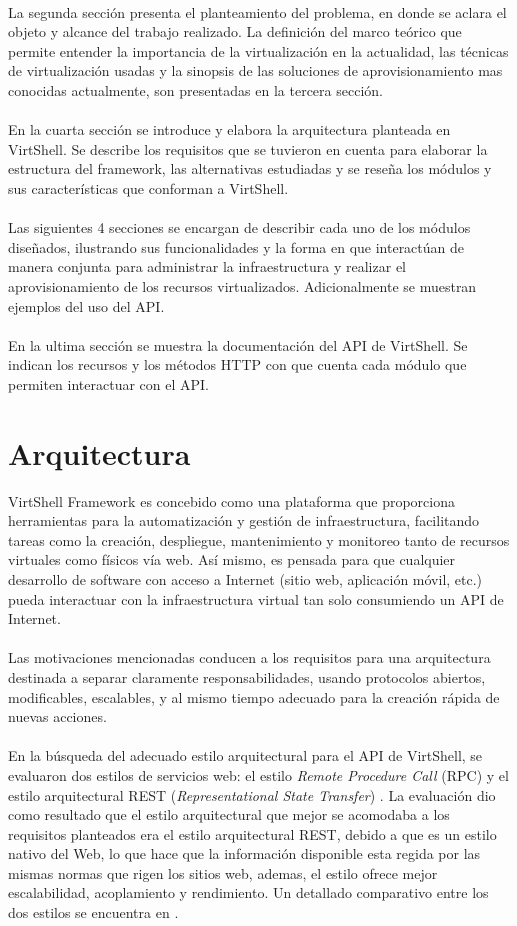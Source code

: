 \documentclass[conference, spanish]{IEEEtran}
\begin{document}
\\
La segunda sección presenta el planteamiento del problema, en donde se aclara el objeto y alcance del trabajo realizado. La definición del marco teórico que permite entender la importancia de la virtualización en la actualidad, las técnicas de virtualización usadas y la sinopsis de las soluciones de aprovisionamiento mas conocidas actualmente, son presentadas en la tercera sección.\\
\\
En la cuarta sección se introduce y elabora la arquitectura planteada en VirtShell. Se describe los requisitos que se tuvieron en cuenta para elaborar la estructura del framework, las alternativas estudiadas y se reseña los módulos y sus características que conforman a VirtShell.\\
\\
Las siguientes 4 secciones se encargan de describir cada uno de los módulos diseñados, ilustrando sus funcionalidades y la forma en que interactúan de manera conjunta para administrar la infraestructura y realizar el aprovisionamiento de los recursos virtualizados. Adicionalmente se muestran ejemplos del uso del API.\\
\\
En la ultima sección se muestra la documentación del API de VirtShell. Se indican los recursos y los métodos HTTP con que cuenta cada módulo que permiten interactuar con el API.\\


\section{Arquitectura}
VirtShell Framework es concebido como una plataforma que proporciona herramientas para la automatización y gestión de infraestructura, facilitando tareas como la creación, despliegue, mantenimiento y monitoreo tanto de recursos virtuales como físicos vía web. Así mismo, es pensada para que cualquier desarrollo de software con acceso a Internet (sitio web, aplicación móvil, etc.) pueda interactuar con la infraestructura virtual tan solo consumiendo un API de Internet.\\
\\
Las motivaciones mencionadas conducen a los requisitos para una arquitectura destinada a separar claramente responsabilidades, usando protocolos abiertos, modificables, escalables, y al mismo tiempo adecuado para la creación rápida de nuevas acciones. \\
\\
En la búsqueda del adecuado estilo arquitectural para el API de VirtShell, se evaluaron dos estilos de servicios web: el estilo \emph{Remote Procedure Call} (RPC) y el estilo arquitectural REST (\emph{Representational State Transfer}) \cite{fielding00}. La evaluación dio como resultado que el estilo arquitectural que mejor se acomodaba a los requisitos planteados era el estilo arquitectural REST, debido a que es un estilo nativo del Web, lo que hace que la información disponible esta regida por las mismas normas que rigen los sitios web, ademas, el estilo ofrece mejor escalabilidad, acoplamiento y rendimiento. Un detallado comparativo entre los dos estilos se encuentra en \cite{Xinyang09}. 
\end{document}
